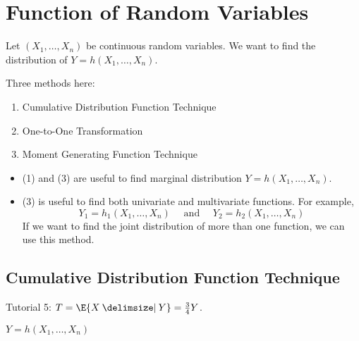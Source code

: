 \chapter{Function of Random Variables}
Let $ (X_1,\ldots,X_n) $ be continuous random
variables. We want to find the distribution
of $ Y=h(X_1,\ldots,X_n) $.

Three methods here:
\begin{enumerate}[label=(\arabic*)]
    \item Cumulative Distribution Function Technique
    \item One-to-One Transformation
    \item Moment Generating Function Technique
\end{enumerate}
\begin{itemize}
    \item (1) and (3) are useful to find marginal distribution
          $ Y=h(X_1,\ldots,X_n) $.
    \item (3) is useful to find both univariate and multivariate
          functions. For example,
          \[ Y_1=h_1(X_1,\ldots,X_n)\quad\text{ and }\quad Y_2=h_2(X_1,\ldots,X_n) \]
          If we want to find the joint distribution of more than one function, we can
          use this method.
\end{itemize}
\section{Cumulative Distribution Function Technique}
Tutorial 5: $ T=\E{X\given Y}=\frac{3}{4} Y $.

$ Y=h(X_1,\ldots,X_n) $

